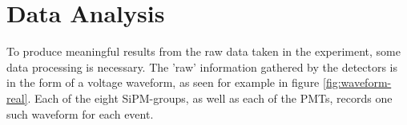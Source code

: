 \chapter{Data Analysis}


    To produce meaningful results from the raw data taken in the experiment, some data processing is necessary. The 'raw' information gathered by the detectors is in the form of a voltage waveform, as seen for example in figure \ref{fig:waveform-real}. Each of the eight \ac{SiPM}-groups, as well as each of the \acsp{PMT}, records one such waveform for each event.
    
